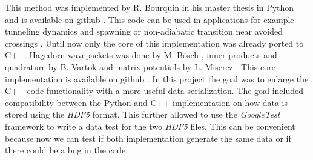 This method was implemented by R. Bourquin in his master thesis \cite{B_master_thesis} in Python and is available on github \cite{waveblocksnd}. This code can be used in applications for example tunneling dynamics and spawning \cite{GHJ_tunneling_spawning} or non-adiabatic transition near avoided crossings \cite{BGH_natac}. Until now only the core of this implementation was already ported to C++. Hagedorn wavepackets was done by M. B\"osch \cite{bt_michajab}, inner products and quadrature by B. Vartok \cite{st_benedekv} and matrix potentials by L. Miserez \cite{bt_lionelm}. This core implementation is available on github \cite{libwaveblocks}. In this project the goal was to enlarge the C++ code functionality with a more useful data serialization. The goal included compatibility between the Python and C++ implementation on how data is stored using the \textit{HDF5} format. This further allowed to use the \textit{GoogleTest} framework to write a data test for the two \textit{HDF5} files. This can be convenient because now we can test if both implementation generate the same data or if there could be a bug in the code.